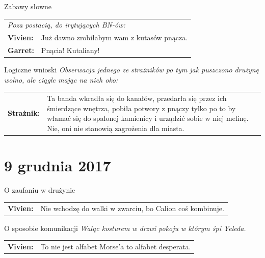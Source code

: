 \documentclass[10pt,twoside,twocolumn]{book}
\begin{document}
\begin{rpg-quotebox}{Zabawy słowne}
   \begin{tabularx}{\columnwidth}{lX}
      \multicolumn{2}{l}{\textit{Poza postacią, do irytujących BN-ów:}}\\
      \textbf{Vivien:} & Już dawno zrobiłabym wam z kutasów pnącza.\\
      \textbf{Garret:} & Pnącia! Kutaliany!\\
   \end{tabularx}
\end{rpg-quotebox}

\begin{rpg-quotebox}{Logiczne wnioski}
   \textit{Obserwacja jednego ze strażników po tym jak puszczono drużynę wolno, ale ciągle mając na nich oko:}\\
   
   \begin{tabularx}{\columnwidth}{lX}
      \textbf{Strażnik:} & Ta banda wkradła się do kanałów, przedarła się przez ich śmierdzące wnętrza, pobiła potwory z pnączy tylko po to by włamać się do spalonej kamienicy i urządzić sobie w niej melinę. Nie, oni nie stanowią zagrożenia dla miasta.\\
   \end{tabularx}
\end{rpg-quotebox}


\section*{9 grudnia 2017}

\begin{rpg-quotebox}{O zaufaniu w drużynie}
   \begin{tabularx}{\columnwidth}{lX}
      \textbf{Vivien:} & Nie wchodzę do walki w zwarciu, bo Calion coś kombinuje.\\
   \end{tabularx}
\end{rpg-quotebox}

\begin{rpg-quotebox}{O sposobie komunikacji}
   \textit{Waląc kosturem w drzwi pokoju w którym śpi Yeleda.}\\

   \begin{tabularx}{\columnwidth}{lX}
      \textbf{Vivien:} &  To nie jest alfabet Morse'a to alfabet desperata.\\
   \end{tabularx}
\end{rpg-quotebox}
\end{document}
